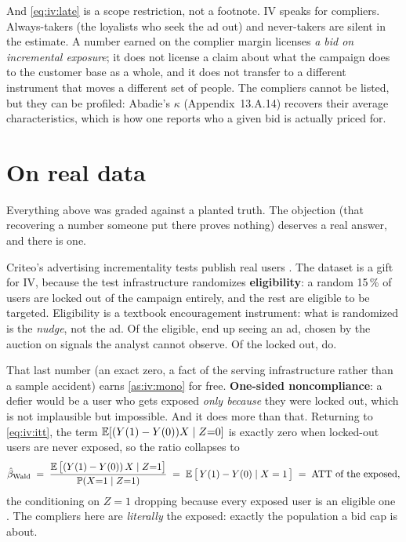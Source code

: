 And \cref{eq:iv:late} is a scope restriction, not a footnote. IV speaks for compliers. Always-takers
(the loyalists who seek the ad out) and never-takers are silent in the estimate. A number
earned on the complier margin licenses \emph{a bid on incremental exposure}; it does not license a
claim about what the campaign does to the customer base as a whole, and it does not transfer to a
different instrument that moves a different set of people. The compliers cannot be listed, but they
can be profiled: Abadie's $\kappa$ (Appendix~13.A.14) recovers their average characteristics, which
is how one reports who a given bid is actually priced for.

\section{On real data}
\label{sec:iv:real}

Everything above was graded against a planted truth. The objection (that recovering a number
someone put there proves nothing) deserves a real answer, and there is one.

Criteo's advertising incrementality tests publish \nbElevenBNFull{} real users
\citep{diemert2018}. The dataset is a gift for IV, because the test infrastructure randomizes
\textbf{eligibility}: a random 15\,\% of users are locked out of the campaign entirely, and the rest
are eligible to be targeted. Eligibility is a textbook encouragement instrument: what is
randomized is the \emph{nudge}, not the ad. Of the eligible, \pc{\nbElevenBPExposedEligible} end up
seeing an ad, chosen by the auction on signals the analyst cannot observe. Of the locked out,
\pc{\nbElevenBPExposedLocked} do.

That last number (an exact zero, a fact of the serving infrastructure rather than a sample
accident) earns \cref{as:iv:mono} for free. \textbf{One-sided noncompliance}: a defier would be a
user who gets exposed \emph{only because} they were locked out, which is not implausible but
impossible. And it does more than that. Returning to \cref{eq:iv:itt}, the term
$\operatorname{\mathbb{E}}[(Y(1) - Y(0))X \mid Z{=}0]$ is exactly zero when locked-out users are never exposed, so the
ratio collapses to
%
\begin{equation}
  \hat\beta_{\text{Wald}}
  \;=\; \frac{\operatorname{\mathbb{E}}\big[(Y(1) - Y(0))\,X \mid Z{=}1\big]}{\operatorname{\mathbb{P}}(X{=}1 \mid Z{=}1)}
  \;=\; \operatorname{\mathbb{E}}\big[\,Y(1) - Y(0) \mid X = 1\,\big]
  \;=\; \text{ATT of the exposed},
  \label{eq:iv:bloom}
\end{equation}
%
the conditioning on $Z{=}1$ dropping because every exposed user is an eligible one
\citep{bloom1984}. The compliers here are \emph{literally} the exposed: exactly the
population a bid cap is about.

